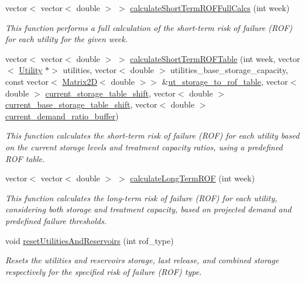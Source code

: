 \begin{DoxyCompactItemize}
vector$<$ vector$<$ double $>$ $>$ \mbox{\hyperlink{classContinuityModelROF_a975e7566b4c0db6e3731647b6e76b9c8}{calculate\+Short\+Term\+R\+O\+F\+Full\+Calcs}} (int week)
\begin{DoxyCompactList}\small\item\em This function performs a full calculation of the short-\/term risk of failure (R\+OF) for each utility for the given week. \end{DoxyCompactList}\item 
vector$<$ vector$<$ double $>$ $>$ \mbox{\hyperlink{classContinuityModelROF_a48b31e060f1d75e31fa591015f4a1c22}{calculate\+Short\+Term\+R\+O\+F\+Table}} (int week, vector$<$ \mbox{\hyperlink{classUtility}{Utility}} $\ast$$>$ utilities, vector$<$ double $>$ utilities\+\_\+base\+\_\+storage\+\_\+capacity, const vector$<$ \mbox{\hyperlink{classMatrix2D}{Matrix2D}}$<$ double $>$$>$ \&\mbox{\hyperlink{classContinuityModelROF_ada25d241caf860255ad00097f5e7adb6}{ut\+\_\+storage\+\_\+to\+\_\+rof\+\_\+table}}, vector$<$ double $>$ \mbox{\hyperlink{classContinuityModelROF_a443efa8d5a8bcbb1fea1a0bc929c77cd}{current\+\_\+storage\+\_\+table\+\_\+shift}}, vector$<$ double $>$ \mbox{\hyperlink{classContinuityModelROF_acaebccba4f4ed286c5da02d6c2c90605}{current\+\_\+base\+\_\+storage\+\_\+table\+\_\+shift}}, vector$<$ double $>$ \mbox{\hyperlink{classContinuityModelROF_a1a274033b741e664268515de8e8eb3bc}{current\+\_\+demand\+\_\+ratio\+\_\+buffer}})
\begin{DoxyCompactList}\small\item\em This function calculates the short-\/term risk of failure (R\+OF) for each utility based on the current storage levels and treatment capacity ratios, using a predefined R\+OF table. \end{DoxyCompactList}\item 
vector$<$ vector$<$ double $>$ $>$ \mbox{\hyperlink{classContinuityModelROF_a0b66880fe153cbd0b85a5b416b98e9a6}{calculate\+Long\+Term\+R\+OF}} (int week)
\begin{DoxyCompactList}\small\item\em This function calculates the long-\/term risk of failure (R\+OF) for each utility, considering both storage and treatment capacity, based on projected demand and predefined failure thresholds. \end{DoxyCompactList}\item 
void \mbox{\hyperlink{classContinuityModelROF_acd72d71a29cef49c4de3d111378b76c7}{reset\+Utilities\+And\+Reservoirs}} (int rof\+\_\+type)
\begin{DoxyCompactList}\small\item\em Resets the utilities\textquotesingle{} and reservoirs\textquotesingle{} storage, last release, and combined storage respectively for the specified risk of failure (R\+OF) type. \end{DoxyCompactList}\item 

\end{DoxyCompactItemize}

